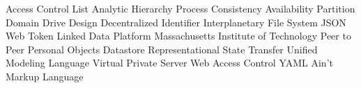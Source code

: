 \begin{acronym}[MIT] %
 {Access Control List}
 {Analytic Hierarchy Process}
 {Consistency Availability Partition}
 {Domain Drive Design}
 {Decentralized Identifier}
 {Interplanetary File System}
 {JSON Web Token}
 {Linked Data Platform}
 {Massachusetts Institute of Technology}
 {Peer to Peer}
 {Personal Objects Datastore}
 {Representational State Transfer}
 {Unified Modeling Language}
 {Virtual Private Server}
 {Web Access Control}
 {YAML Ain't Markup Language}
\end{acronym}